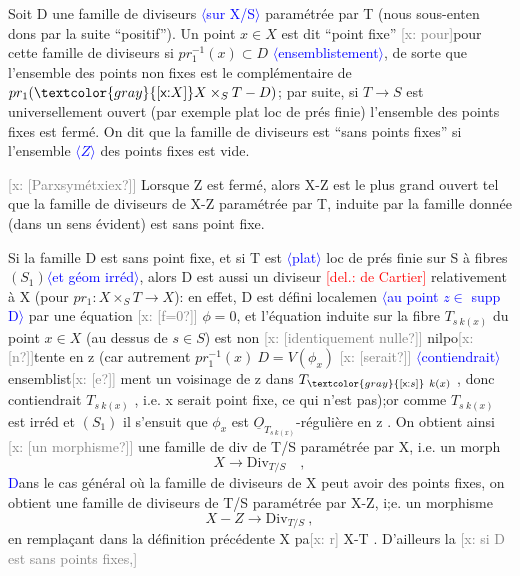 \documentclass[11pt]{article}
\newcommand{\scanpage}[1]{\par\bigskip\noindent{\small\sffamily[scan #1]}\par}
\newcommand{\mspage}[1]{{\small\sffamily[p.\,#1]}}
\newcommand{\hand}[1]{\textcolor{blue}{#1}}
\newcommand{\inserted}[2][]{\textcolor{blue}{$\langle$#2$\rangle$}}
\newcommand{\deleted}[1]{\textcolor{red}{[\textsf{del.:} #1]}}
\newcommand{\xout}[1]{\textcolor{gray}{[\textsf{x:} #1]}}
\newcommand{\unsure}[1]{[#1?]}
\begin{document}
Soit D une famille de diviseurs \inserted[typed]{sur X/S} paramétrée par T (nous sous-enten%
dons par la suite ``positif''). Un point $x\in X$ est dit ``point fixe'' \xout{pour}pour
cette famille de diviseurs si $pr_1^{-1}(x)\subset D$ \inserted{ensemblistement}, de sorte que l'ensemble des
points non fixes est le complémentaire de $pr_1(\xout{X}X\times_S T - D)$; par suite, si
$T\longrightarrow S$ est universellement ouvert (par exemple plat loc de prés finie)
l'ensemble des points fixes est fermé. On dit que la famille de diviseurs
est ``sans points fixes'' si l'ensemble \inserted{$Z$} des points fixes est vide.

\mspage{112}

\clearpage
\scanpage{25/113}
\mspage{\hand{16}}

\xout{\unsure{Parxsymétxiex}} Lorsque Z est fermé, alors X-Z est le plus grand ouvert
tel que la famille de diviseurs de X-Z paramétrée par T, induite par la
famille donnée (dans un sens évident) est sans point fixe.

Si la famille D est sans point fixe, et si T est \inserted{plat} loc de prés finie
sur S à fibres $(S_1)$\inserted{et géom irréd}, alors D est aussi un diviseur \deleted{de Cartier}
relativement à X (pour $pr_1 : X\times_S T \longrightarrow X$): en effet, D est défini localemen
\inserted{au point $z \in$ supp D} par une équation \xout{\unsure{f=0}} $\phi = 0$, et l'équation induite sur la fibre
$T_{s\ k(x)}$ du point $x\in X$ (au dessus de $s\in S$) est non \xout{\unsure{identiquement nulle}}
nilpo\xout{\unsure{n}}tente en z (car autrement $pr_1^{-1}(x)\ D = V(\phi_x)$ \xout{\unsure{serait}} \inserted[typed]{contiendrait} ensemblist\xout{\unsure{e}}
ment un voisinage de z dans $T_{\xout{s}\ k(x)}$ , donc contiendrait $T_{s\ k(x)}$ , i.e.
x serait point fixe, ce qui n'est pas);or comme $T_{s\ k(x)}$ est irréd et $(S_1)$
il s'ensuit que $\phi_x$ est $\underline{O}_{T_{s\ k(x)}}$-régulière en z . On obtient ainsi
\xout{\unsure{un morphisme}} une famille de div de T/S paramétrée par X, i.e. un morph
\[ X \longrightarrow \mathrm{Div}_{T/S} \quad , \]
\hand{D}ans le cas général où la famille de diviseurs de X peut avoir des points
fixes, on obtient une famille de diviseurs de T/S paramétrée par X-Z,
i;e. un morphisme
\[ X - Z \longrightarrow \mathrm{Div}_{T/S} \ , \]
en remplaçant dans la définition précédente X pa\xout{r} X-T . D'ailleurs la
\xout{si D est sans points fixes,}
\end{document}
